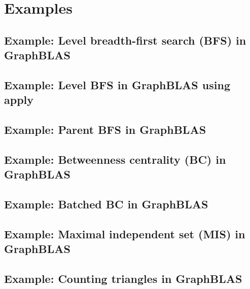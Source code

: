 
\chapter{Examples}
\label{Chp:Examples}

\pagebreak
\nolinenumbers
\section{Example: Level breadth-first search (BFS) in GraphBLAS}
{\scriptsize

}
\vfill

\pagebreak
\nolinenumbers
\section{Example: Level BFS in GraphBLAS using apply}
{\scriptsize

}
\vfill

\pagebreak
\nolinenumbers
\section{Example: Parent BFS in GraphBLAS}
{\scriptsize

}
\vfill

\pagebreak
\nolinenumbers
\section{Example: Betweenness centrality (BC) in GraphBLAS}
\label{App:BCnobatch}
{\scriptsize

}
\vfill

\pagebreak
\nolinenumbers
\section{Example: Batched BC in GraphBLAS}
{\scriptsize

}
\vfill

\pagebreak
\nolinenumbers
\section{Example: Maximal independent set (MIS) in GraphBLAS}
{\scriptsize

}
\vfill

\pagebreak
\nolinenumbers
\section{Example: Counting triangles in GraphBLAS}
{\scriptsize

}
\vfill
\pagebreak

\linenumbers
